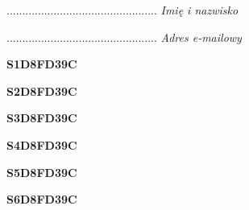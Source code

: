 \begin{turn}{90}\begin{minipage}{\linewidth} \vspace{20mm} ................................................  \textit{Imię i nazwisko}\end{minipage}\end{turn}

\begin{turn}{90}\begin{minipage}{\linewidth} \vspace{20mm} ................................................  \textit{Adres e-mailowy}\end{minipage}\end{turn}

\begin{turn}{90}\huge \begin{minipage}{\linewidth} \vspace{10mm}\textbf{S1D8FD39C}\end{minipage}\end{turn}

\begin{turn}{90}\huge \begin{minipage}{\linewidth} \vspace{10mm}\textbf{S2D8FD39C}\end{minipage}\end{turn}

\begin{turn}{90}\huge \begin{minipage}{\linewidth} \vspace{10mm}\textbf{S3D8FD39C}\end{minipage}\end{turn}

\begin{turn}{90}\huge \begin{minipage}{\linewidth} \vspace{10mm}\textbf{S4D8FD39C}\end{minipage}\end{turn}

\begin{turn}{90}\huge \begin{minipage}{\linewidth} \vspace{10mm}\textbf{S5D8FD39C}\end{minipage}\end{turn}

\begin{turn}{90}\huge \begin{minipage}{\linewidth} \vspace{10mm}\textbf{S6D8FD39C}\end{minipage}\end{turn}

